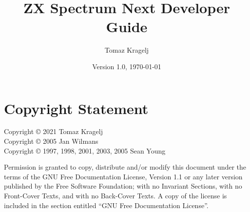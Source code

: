 \documentclass[12pt,twoside,openright,a4paper]{book}
\begin{document}
\frontmatter


\title{ZX Spectrum Next Developer Guide}
\author{Tomaz Kragelj}
\date{Version 1.0, \today}

\maketitle




\chapter*{Copyright Statement}

Copyright {\copyright} 2021 Tomaz Kragelj\\
Copyright {\copyright} 2005 Jan Wilmans\\
Copyright {\copyright} 1997, 1998, 2001, 2003, 2005 Sean Young

Permission is granted to copy, distribute and/or modify this document under the terms of the GNU Free Documentation License, Version 1.1 or any later version published by the Free Software Foundation; with no Invariant Sections, with no Front-Cover Texts, and with no Back-Cover Texts. A copy of the license is included in the section entitled ``GNU Free Documentation License''.



\setcounter{page}{0}
\pagestyle{clean}


\setcounter{tocdepth}{1}
\dominitoc \tableofcontents

\noptcrule
\nomtcrule									%
\renewcommand{\mtcoffset}{-1.5em}			%
\def\mtcSfont{\normalsize}
\def\mtcSSfont{\small}



\mainmatter
\end{document}
